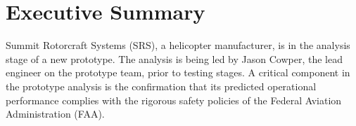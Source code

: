 \documentclass[12pt]{report}
\begin{document}

\pagestyle{fancy} %
\fancyhf{}
\fancyhead[]{\nouppercase{\rightmark\hfill\leftmark}}
\clearpage
  




\chapter*{Executive Summary}

Summit Rotorcraft Systems (SRS), a helicopter manufacturer, is in the analysis stage of a new prototype. The analysis is being led by Jason Cowper,
the lead engineer on the prototype team, prior to testing stages. A critical component in the prototype analysis is the confirmation that its
predicted operational performance complies with the rigorous safety policies of the Federal Aviation Administration (FAA).
\end{document}

